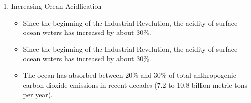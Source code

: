 \documentclass[oneside]{book}
\begin{document}
\begin{enumerate}
\begin{enumerate}
\begin{itemize}
        \end{itemize}
    \end{enumerate}
    \item Increasing Ocean Acidfication \begin{itemize}
        \item Since the beginning of the Industrial Revolution, the acidity of surface ocean waters has increased by about 30\%.
        \item Since the beginning of the Industrial Revolution, the acidity of surface ocean waters has increased by about 30\%.
        \item The ocean has absorbed between 20\% and 30\% of total anthropogenic carbon dioxide emissions in recent decades (7.2 to 10.8 billion metric tons per year).
    \end{itemize} 
\end{enumerate}
\end{document}
